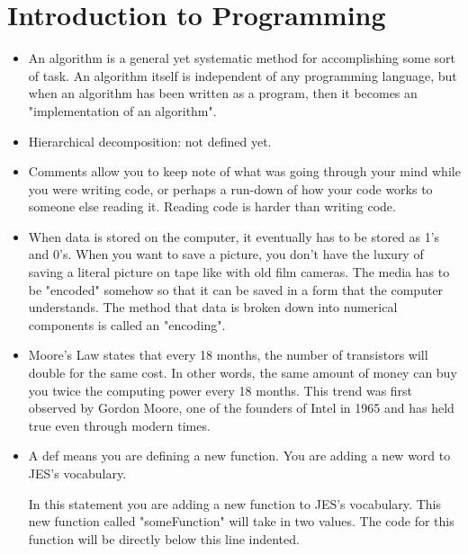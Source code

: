 \chapter{Introduction to Programming}
\begin{exercises}

\begin{ex}
\begin{itemize}
\item An algorithm is a general yet systematic method for accomplishing
some sort of task. An algorithm itself is independent of any programming
language, but when an algorithm has been written as a program, then it
becomes an "implementation of an algorithm".

\item Hierarchical decomposition: not defined yet.

\item Comments allow you to keep note of what was going through your mind
while you were writing code, or perhaps a run-down of how your code works
to someone else reading it. Reading code is harder than writing code.

\item When data is stored on the computer, it eventually has to be stored
as 1's and 0's. When you want to save a picture, you don't have the luxury
of saving a literal picture on tape like with old film cameras. The media
has to be "encoded" somehow so that it can be saved in a form that the
computer understands. The method that data is broken down into numerical
components is called an "encoding".

\item Moore's Law states that every 18 months, the number of transistors
will double for the same cost. In other words, the same amount of money can
buy you twice the computing power every 18 months. This trend was first
observed by Gordon Moore, one of the founders of Intel in 1965 and has held
true even through modern times.
\end{itemize}
\end{ex}

\begin{ex}
\begin{itemize}
\item
A def means you are defining a new function. You are adding a new word to
 JES's vocabulary.

In this statement you are adding a new function to JES's vocabulary. This
new function called "someFunction" will take in two values. The code for
this function will be directly below this line indented.


\end{itemize}
\end{ex}
\end{exercises}
